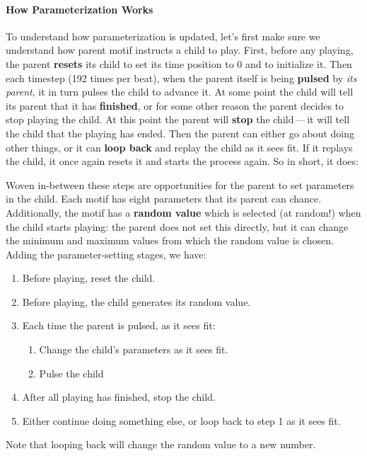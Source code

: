 \documentclass[twoside,10pt]{article}
\begin{document}
\paragraph{How Parameterization Works}
To understand how parameterization is updated, let's first make sure we understand how  parent motif instructs a child to play.  First, before any playing, the parent {\bf resets} its child to set its time position to 0 and to initialize it.  Then each timestep (192 times per beat), when the parent itself is being {\bf pulsed} by {\it its parent}, it in turn pulses the child to advance it.  At some point the child will tell its parent that it has {\bf finished}, or for some other reason the parent decides to stop playing the child.  At this point the parent will {\bf stop} the child\,---\,it will tell the child that the playing has ended.  Then the parent can either go about doing other things, or it can {\bf loop back} and replay the child as it sees fit.  If it replays the child, it once again resets it and starts the process again.  So in short, it does:

Woven in-between these steps are opportunities for the parent to set parameters in the child.    Each motif has eight parameters that its parent can chance.  Additionally, the motif has a {\bf random value} which is selected (at random!) when the child starts playing: the parent does not set this directly, but it can change the minimum and maximum values from which the random value is chosen.  Adding the parameter-setting stages, we have: 

\begin{enumerate}
\item Before playing, reset the child.
\item Before playing, the child generates its random value.
\item Each time the parent is pulsed, as it sees fit:
\begin{enumerate}
\item Change the child's parameters as it sees fit.
\item Pulse the child
\end{enumerate}
\item After all playing has finished, stop the child.
\item Either continue doing something else, or loop back to step 1 as it sees fit. 
\end{enumerate}

Note that looping back will change the random value to a new number.
\end{document}
